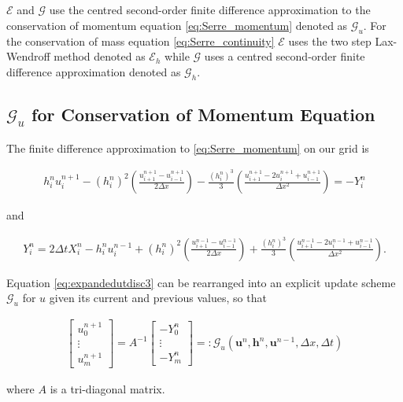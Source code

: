 \documentclass[times]{elsarticle}
\begin{document}




\appendix{}
\section{}
$\mathcal{E}$ and $\mathcal{G}$ use the centred second-order finite difference approximation to the conservation of momentum equation \eqref{eq:Serre_momentum} denoted as $\mathcal{G}_u$. For the conservation of mass equation \eqref{eq:Serre_continuity} $\mathcal{E}$ uses the two step Lax-Wendroff method denoted as $\mathcal{E}_h$ while $\mathcal{G}$ uses a centred second-order finite difference approximation denoted as $\mathcal{G}_h$.
\subsection{$\mathcal{G}_u$ for Conservation of Momentum Equation}
The finite difference approximation to \eqref{eq:Serre_momentum} on our grid is
\begin{linenomath*}
	\begin{gather}
	h^{n}_iu^{n+1}_i - \left(h^{n}_i\right)^2 \left(\frac{u^{n+1}_{i+1} -u^{n+1}_{i-1} }{2 \Delta x}\right) - \frac{\left(h^{n}_i\right)^3}{3}\left(\frac{u^{n+1}_{i+1} - 2u^{n+1}_{i} + u^{n+1}_{i-1} }{\Delta x^2}\right) = - Y^n_i
	\label{eq:expandedutdisc3}
	\end{gather}
\end{linenomath*}
and
\begin{linenomath*}
	\begin{gather*}
	Y_i^n = 2\Delta tX_i^{n} - h_i^{n}u_i^{n-1} + \left(h_i^{n}\right)^2\left(\frac{u^{n-1}_{i+1} -u^{n-1}_{i-1} }{2 \Delta x}\right) + \frac{\left(h_i^{n}\right)^3}{3}\left(\frac{u^{n-1}_{i+1} - 2u^{n-1}_{i} + u^{n-1}_{i-1} }{\Delta x^2}\right).
	\label{eq:expandfactor Xp}
	\end{gather*}
\end{linenomath*}
 Equation \eqref{eq:expandedutdisc3} can be rearranged into an explicit update scheme $\mathcal{G}_u$ for $u$ given its current and previous values, so that
\begin{linenomath*}
	\begin{gather}
	\left[\begin{array}{c}
	u^{n+1}_0 \\
	\vdots \\
	u^{n+1}_m \end{array}\right]
	= A^{-1} \left[\begin{array}{c}
	-Y^n_0 \\
	\vdots \\
	-Y^n_m \end{array}\right] =: \mathcal{G}_u\left(\boldsymbol{u}^n,\boldsymbol{h}^n, \boldsymbol{u}^{n-1}, \Delta x, \Delta t \right)
	\label{eq:FDcentforu}
	\end{gather}
\end{linenomath*}
where $A$ is a tri-diagonal matrix.
\end{document}

